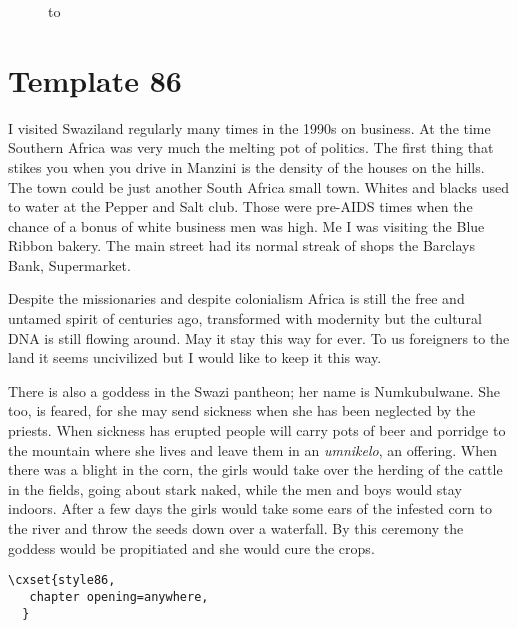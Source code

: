 \begin{figure}[ht]
\vbox to 
\end{figure}


\section{Template 86}

I visited Swaziland regularly many times in the 1990s on business. At the time Southern Africa was very much the melting pot of politics. The first thing that stikes you when you drive in Manzini is the density of the houses on the hills. The town could be just another South Africa small town. Whites and blacks used to water at the Pepper and Salt club. Those were pre-AIDS times when the chance of a bonus of white business men was high. Me I was visiting the Blue Ribbon bakery. The main street had its normal streak of shops the Barclays Bank, Supermarket. 

Despite the missionaries and despite colonialism Africa is still the free and untamed spirit of centuries ago, transformed with modernity but the cultural DNA is still flowing around. May it stay this way for  ever. To us foreigners to the land it seems uncivilized but I would like to keep it this way. 

There is also a goddess in the Swazi pantheon; her name is Numkubulwane. She too, is feared, for she may send sickness when she has been neglected by the priests. When sickness has erupted people will carry pots of beer and porridge to the mountain where she lives and leave them in an \emph{umnikelo}, an offering. When there was a blight in the corn, the girls would take over the herding of the cattle in the fields, going about stark naked, while the men and boys would stay indoors. After a few days the girls would take some ears of the infested corn to the river and throw the seeds down over a waterfall. By this ceremony the goddess would be propitiated and she would cure the crops. 


\example
\begin{verbatim}
\cxset{style86,
   chapter opening=anywhere,
  }
\end{verbatim}


 

